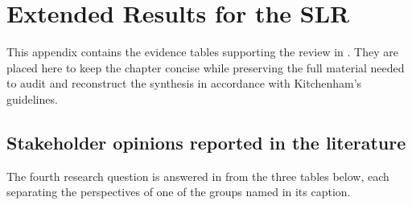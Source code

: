 \chapter{Extended Results for the SLR}
\label{chapter:appendixA}

This appendix contains the evidence tables supporting the review in . They are placed here to keep the chapter concise while preserving the full material needed to audit and reconstruct the synthesis in accordance with Kitchenham's guidelines.

\section{Stakeholder opinions reported in the literature}
\label{sec:appA_opinions}

The fourth research question is answered in  from the three
tables below, each separating the perspectives of one of the groups named in
its caption.

